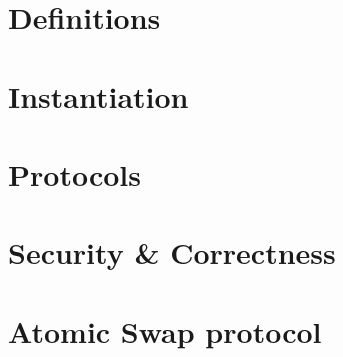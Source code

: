 \section{Definitions}\label{sec:atom:definitions}


\section{Instantiation}\label{sec:atom:inst}


\section{Protocols}\label{sec:atom:protocols}


\section{Security \& Correctness} \label{sec:atom:security}


\section{Atomic Swap protocol}\label{sec:atom:atomic-swap}
